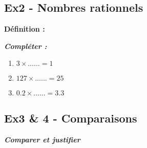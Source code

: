 \documentclass[11pt]{article}
\begin{document}
\subsection*{Ex2 - Nombres rationnels}

\textbf{Définition :} \dotfill

\textit{\textbf{Compléter :}}

\begin{multicols}{3}

  \begin{enumerate}
  \item $ 3 \times \ldots \ldots = 1$
  \item $ 127 \times \ldots \ldots = 25$
  \item $ 0.2 \times \ldots \ldots = 3.3$
  \end{enumerate}

\end{multicols}

\subsection*{Ex3 \& 4 - Comparaisons}
\textit{\textbf{Comparer et justifier}}
\end{document}
